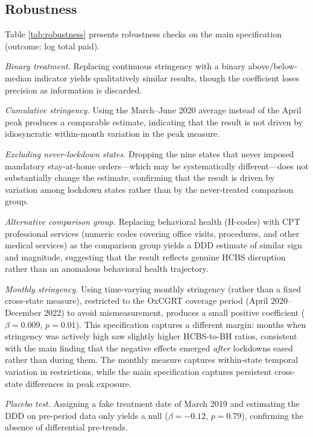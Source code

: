 \documentclass[12pt]{article}
\begin{document}
\subsection{Robustness}



Table \ref{tab:robustness} presents robustness checks on the main specification (outcome: log total paid).

\textit{Binary treatment.} Replacing continuous stringency with a binary above/below-median indicator yields qualitatively similar results, though the coefficient loses precision as information is discarded.

\textit{Cumulative stringency.} Using the March--June 2020 average instead of the April peak produces a comparable estimate, indicating that the result is not driven by idiosyncratic within-month variation in the peak measure.

\textit{Excluding never-lockdown states.} Dropping the nine states that never imposed mandatory stay-at-home orders---which may be systematically different---does not substantially change the estimate, confirming that the result is driven by variation among lockdown states rather than by the never-treated comparison group.

\textit{Alternative comparison group.} Replacing behavioral health (H-codes) with CPT professional services (numeric codes covering office visits, procedures, and other medical services) as the comparison group yields a DDD estimate of similar sign and magnitude, suggesting that the result reflects genuine HCBS disruption rather than an anomalous behavioral health trajectory.

\textit{Monthly stringency.} Using time-varying monthly stringency (rather than a fixed cross-state measure), restricted to the OxCGRT coverage period (April 2020--December 2022) to avoid mismeasurement, produces a small positive coefficient ($\beta = 0.009$, $p = 0.01$). This specification captures a different margin: months when stringency was actively high saw slightly higher HCBS-to-BH ratios, consistent with the main finding that the negative effects emerged \textit{after} lockdowns eased rather than during them. The monthly measure captures within-state temporal variation in restrictions, while the main specification captures persistent cross-state differences in peak exposure.

\textit{Placebo test.} Assigning a fake treatment date of March 2019 and estimating the DDD on pre-period data only yields a null ($\beta = -0.12$, $p = 0.79$), confirming the absence of differential pre-trends.
\end{document}
